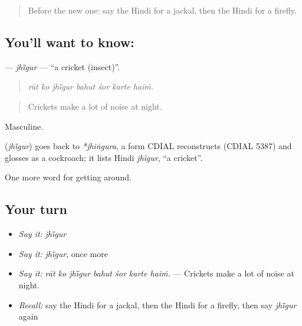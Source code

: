 \label{lesson:HI-C449-jhigur}



\begin{quote}
Before the new one: say the Hindi for a jackal, then the Hindi for a firefly.
\end{quote}

\subsection*{You'll want to know: }
\textbf{} — \emph{jhī̃gur} — \textquotedblleft{}a cricket (insect)\textquotedblright{}.

\begin{quote}
      
\end{quote}

\begin{quote}
\emph{rāt ko jhī̃gur bahut śor karte haiṁ.}
\end{quote}

\begin{quote}
Crickets make a lot of noise at night.
\end{quote}

Masculine.

\begin{cousinweb}
\textbf{} (\emph{jhī̃gur}) goes back to \emph{*jhiṅgura}, a form CDIAL reconstructs (CDIAL 5387) and glosses as a cockroach; it lists Hindi \emph{jhĩgur}, \textquotedblleft{}a cricket\textquotedblright{}.
\end{cousinweb}

\begin{grammarlens}[title={What you've built}]
One more word for getting around.
\end{grammarlens}

\subsection*{Your turn}
\begin{itemize}
\raggedright
  \item \emph{Say it:} \emph{jhī̃gur}
  \item \emph{Say it:} \emph{jhī̃gur}, once more
  \item \emph{Say it:} \emph{rāt ko jhī̃gur bahut śor karte haiṁ.} — Crickets make a lot of noise at night.
  \item \emph{Recall:} say the Hindi for a jackal, then the Hindi for a firefly, then say \emph{jhī̃gur} again
\end{itemize}

